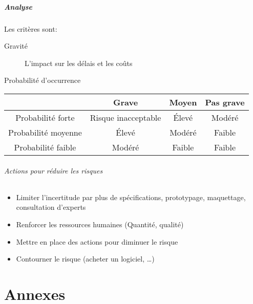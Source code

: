 \documentclass[10pt,a4paper,french]{article}
\begin{document}
\subsubsection{Analyse}

Les critères sont:
\begin{description}
\item[Gravité] L'impact sur les délais et les coûts
\item[Probabilité d'occurrence]
\end{description}

\begin{tabular}{c|ccc}
& Grave & Moyen & Pas grave \\
\hline
Probabilité forte & Risque inacceptable & Élevé & Modéré \\
Probabilité moyenne & Élevé & Modéré & Faible \\
Probabilité faible & Modéré & Faible & Faible
\end{tabular}

\paragraph{Actions pour réduire les risques}
\begin{itemize}
\item Limiter l'incertitude par plus de spécifications, prototypage, maquettage, consultation d'experts
\item Renforcer les ressources humaines (Quantité, qualité)
\item Mettre en place des actions pour diminuer le risque
\item Contourner le risque (acheter un logiciel, \ldots)
\end{itemize}

\appendix %
\part{Annexes}
\printglossaries
\printindex
\end{document}
